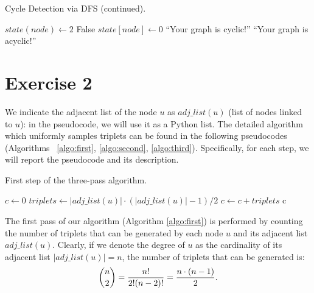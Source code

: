 \documentclass[12pt,a4paper]{article}
\begin{document}
\begin{description}
\begin{algorithm}
\addtocounter{algorithm}{-1}
\caption{Cycle Detection via DFS (continued).}
\begin{algorithmic}[1]
        \EndIf
    \EndIf
\EndFor
\State $state(node) \gets 2$
\State \Return False
\EndFunction
\State
{}
	\State $state[node] \gets 0$
\EndFor
{}
    	\State \Return ``Your graph is cyclic!''
    \EndIf
    \EndIf
\EndFor
\State \Return ``Your graph is acyclic!''
\EndFunction
\end{algorithmic}
\end{algorithm}

\end{description}



\section*{Exercise 2}
We indicate the adjacent list of the node $u$ as $adj\_list(u)$ (list of nodes linked to $u$): in the pseudocode, we will use it as a Python list. The detailed algorithm which uniformly samples triplets can be found in the following pseudocodes (Algorithms ~\ref{algo:first}, \ref{algo:second}, \ref{algo:third}). Specifically, for each step, we will report the pseudocode and its description.

\begin{algorithm}
\caption{First step of the three-pass algorithm.}\label{algo:first}
\begin{algorithmic}[1]
\State $c \gets 0$
	\State $triplets \gets |adj\_list(u)| \cdot (|adj\_list(u)| - 1) / 2$
    \State $c \gets c + triplets $
\EndFor
\State \Return c
\EndFunction
\end{algorithmic}
\end{algorithm}

The first pass of our algorithm (Algorithm \ref{algo:first}) is performed by counting the number of triplets that can be generated by each node $u$ and its adjacent list $adj\_list(u)$. Clearly, if we denote the degree of $u$ as the cardinality of its adjacent list $|adj\_list(u)| = n$, the number of triplets that can be generated is:
\begin{align}
\dbinom{n}{2} = \frac{n!}{2! (n - 2)!} = \frac{n \cdot (n - 1)}{2}.
\end{align}
\end{document}
